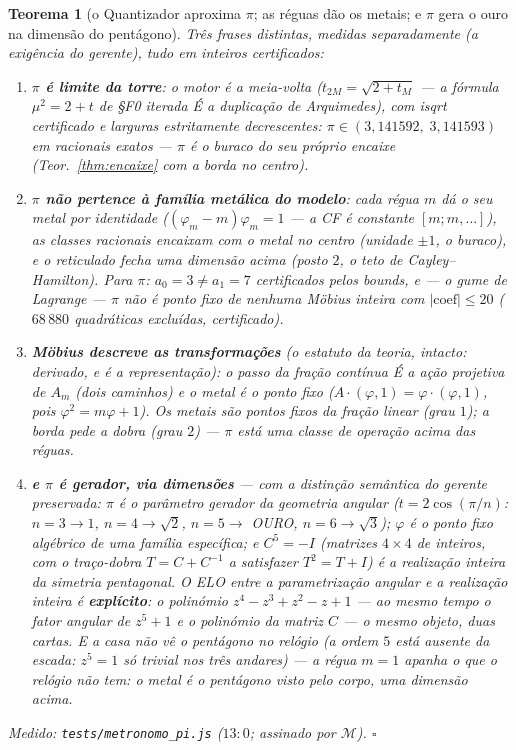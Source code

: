 \documentclass[11pt,a4paper]{article}
\newtheorem{teorema}{Teorema}
\newcommand{\code}[1]{\texttt{\small #1}}
\begin{document}
\begin{teorema}[o Quantizador aproxima $\pi$; as réguas dão os metais;
e $\pi$ gera o ouro na dimensão do pentágono]\label{thm:metronomo-pi}
Três frases distintas, medidas separadamente (a exigência do gerente),
tudo em inteiros certificados:
\begin{enumerate}
\item \textbf{$\pi$ é limite da torre}: o motor é a meia-volta
($t_{2M}=\sqrt{2+t_{M}}$ --- a fórmula $\mu^{2}=2{+}t$ de \S F0
iterada É a duplicação de Arquimedes), com isqrt certificado e
larguras estritamente decrescentes:
$\pi\in(3{,}141592,\;3{,}141593)$ em racionais exatos --- $\pi$ é o
buraco do seu próprio encaixe (Teor.~\ref{thm:encaixe} com a borda no
centro).
\item \textbf{$\pi$ não pertence à família metálica do modelo}: cada
régua $m$ dá o seu metal \emph{por identidade}
($(\varphi_{m}-m)\varphi_{m}=1$ --- a CF é constante $[m;m,\dots]$),
as classes racionais encaixam com o metal no centro (unidade $\pm1$,
o buraco), e o reticulado fecha \emph{uma dimensão acima} (posto $2$,
o teto de Cayley--Hamilton). Para $\pi$: $a_{0}=3\ne a_{1}=7$
certificados pelos bounds, e --- o gume de Lagrange --- $\pi$ não é
ponto fixo de \emph{nenhuma} Möbius inteira com $|\text{coef}|\le20$
($68\,880$ quadráticas excluídas, certificado).
\item \textbf{Möbius descreve as transformações} (o estatuto da
teoria, intacto: \emph{derivado, e é a representação}): o passo da
fração contínua É a ação projetiva de $A_{m}$ (dois caminhos) e o
metal é o ponto fixo ($A\cdot(\varphi,1)=\varphi\cdot(\varphi,1)$,
pois $\varphi^{2}=m\varphi+1$). Os metais são pontos fixos da fração
\emph{linear} (grau $1$); a borda pede a \emph{dobra} (grau $2$) ---
$\pi$ está uma classe de operação acima das réguas.
\item \textbf{e $\pi$ é gerador, via dimensões} --- com a distinção
semântica do gerente preservada: $\pi$ é o \emph{parâmetro gerador da
geometria angular} ($t=2\cos(\pi/n)$: $n{=}3\to1$, $n{=}4\to\sqrt2$,
$n{=}5\to$ OURO, $n{=}6\to\sqrt3$); $\varphi$ é o \emph{ponto fixo
algébrico} de uma família específica; e $C^{5}=-I$ (matrizes
$4\times4$ de inteiros, com o traço-dobra $T=C+C^{-1}$ a satisfazer
$T^{2}=T+I$) é a \emph{realização inteira da simetria pentagonal}. O
ELO entre a parametrização angular e a realização inteira é
\textbf{explícito}: o polinómio $z^{4}-z^{3}+z^{2}-z+1$ --- ao mesmo
tempo o fator angular de $z^{5}+1$ e o polinómio da matriz $C$ --- o
mesmo objeto, duas cartas. E a casa não vê o pentágono no relógio (a
ordem $5$ está ausente da escada: $z^{5}=1$ só trivial nos três
andares) --- a régua $m{=}1$ apanha o que o relógio não tem: \emph{o
metal é o pentágono visto pelo corpo, uma dimensão acima}.
\end{enumerate}
\emph{Medido:} \code{tests/metronomo\_pi.js} ($13{:}0$; assinado por
$\mathcal{M}$).
$\square$
\end{teorema}
\end{document}
